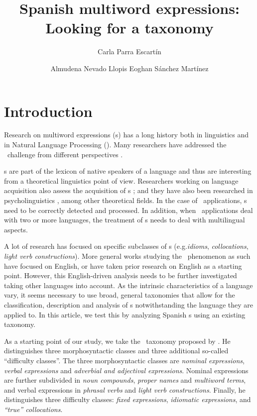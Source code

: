 \documentclass[output=paper]{langsci/langscibook}
\author{Carla Parra Escartín\affiliation{ADAPT Centre, SALIS/CTTS, Dublin City University}%
\and Almudena Nevado Llopis\affiliation{Universidad de San Jorge}%
\lastand Eoghan Sánchez Martínez\affiliation{Universidad de San Jorge}}
\title{Spanish multiword expressions: 
Looking for a taxonomy}
\begin{document}
\section{Introduction}

Research on multiword expressions (\mwe s) has a long history both in linguistics and in Natural Language Processing (\nlp). 
Many researchers have addressed the \mwe\ challenge from different perspectives \citep{Melcuk:1987,Church:1990,Sinclair:1991,smadja1993,moon1998,Lin:1999}.

\mwe s are part of the lexicon of native speakers of a language and thus are interesting from a theoretical linguistics point of view. 
Researchers working on language acquisition also assess the acquisition of \mwe s \citep{Devereux:2007,Villavicencio:2012,Nematzadeh:2013}; and they have also been researched in psycholinguistics \citep{Rapp:2008,Holsinger:2013a,Holsinger:2013b,Schulteimwalde:2015}, among other theoretical fields. 
In the case of \nlp\ applications, \mwe s need to be correctly detected and processed. 
In addition, when \nlp\ applications deal with two or more languages, the treatment of \mwe s needs to deal with multilingual aspects.

A lot of research has focused on specific subclasses of \mwe s (e.g.\@ \textit{idioms}, \textit{collocations}, \textit{light verb constructions}).
More general works studying the \mwe\ phenomenon as such have focused on English, or have taken prior research on English as a starting point. 
However, this English-driven analysis needs to be further investigated taking other languages into account. 
As the intrinsic characteristics of a language vary, it seems necessary to use broad, general taxonomies that allow for the classification, description and analysis of \mwe s notwithstanding the language they are applied to.
In this article, we test this by analyzing Spanish \mwe s using an existing taxonomy.

As a starting point of our study, we take the \mwe\ taxonomy proposed by \citet{Ramisch:2012,Ramisch:2015}. He distinguishes three morphosyntactic classes and three additional so-called ``difficulty classes''. 
The three morphosyntactic classes are \textit{nominal expressions}, \textit{verbal expressions} and \textit{adverbial and adjectival expressions}. 
Nominal expressions are further subdivided in \textit{noun compounds}, \textit{proper names} and \textit{multiword terms}, and verbal expressions in \textit{phrasal verbs} and \textit{light verb constructions}. 
Finally, he distinguishes three difficulty classes: \textit{fixed expressions}, \textit{idiomatic expressions}, and \textit{``true'' collocations}. 
\end{document}
